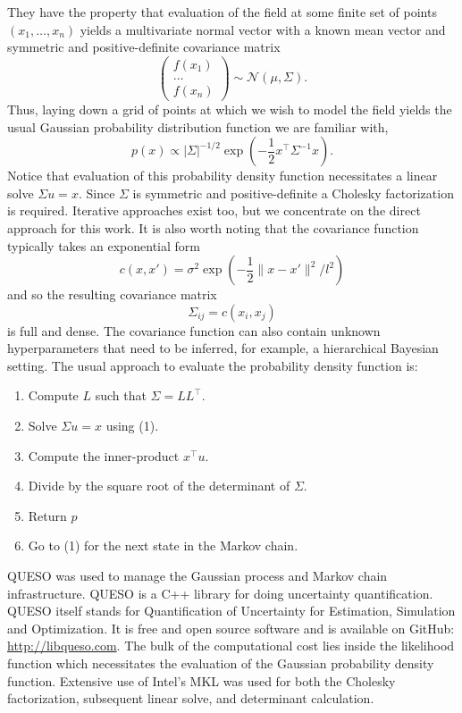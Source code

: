 They have the property that evaluation of the field at some finite set of
points $(x_1, \ldots, x_n)$ yields a multivariate normal vector with a known
mean vector and symmetric and positive-definite covariance matrix
\begin{equation}
  \begin{pmatrix}
    f(x_1) \\
    \hdots \\
    f(x_n)
  \end{pmatrix}
  \sim \mathcal{N}(\mu, \Sigma).
\end{equation}
Thus, laying down a grid of points at which we wish to model the field yields
the usual Gaussian probability distribution function we are familiar with,
\begin{equation}
  p(x) \propto |\Sigma|^{-1/2} \exp(-\frac12 x^\top \Sigma^{-1} x).
\end{equation}
Notice that evaluation of this probability density function necessitates a
linear solve $\Sigma u = x$.  Since $\Sigma$ is symmetric and positive-definite
a Cholesky factorization is required.  Iterative approaches exist too, but we
concentrate on the direct approach for this work.  It is also worth noting that the
covariance function typically takes an exponential form
\begin{equation}
  c(x, x') = \sigma^2 \exp(-\frac12 \| x - x' \|^2 / l^2)
\end{equation}
and so the resulting covariance matrix
\begin{equation}
  \Sigma_{ij} = c(x_i, x_j)
\end{equation}
is full and dense.  The covariance function can also contain
unknown hyperparameters
that need to be inferred, for example, a hierarchical
Bayesian setting.  The usual approach to evaluate the
probability density function is:
\begin{enumerate}
  \item Compute $L$ such that $\Sigma = LL^\top$.
  \item Solve $\Sigma u = x$ using (1).
  \item Compute the inner-product $x^\top u$.
  \item Divide by the square root of the determinant of $\Sigma$.
  \item Return $p$
  \item Go to (1) for the next state in the Markov chain.
\end{enumerate}

QUESO was used to manage the Gaussian process and Markov chain infrastructure.
QUESO is a C++ library for doing uncertainty quantification.  QUESO itself
stands for Quantification of Uncertainty for Estimation, Simulation and
Optimization.  It is free and open source software and is available on GitHub:
\url{http://libqueso.com}.  The bulk of the computational cost lies inside the
likelihood function which necessitates the evaluation of the Gaussian
probability density function.  Extensive use of Intel's MKL was used for both
the Cholesky factorization, subsequent linear solve, and determinant
calculation.

